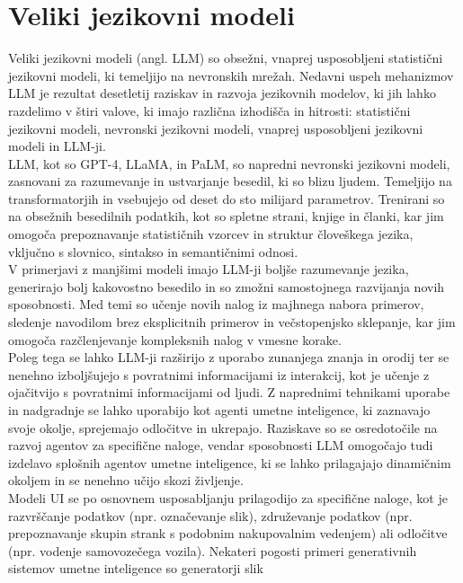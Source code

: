 \documentclass[a4paper,12pt,openright]{book}
\begin{document}
\section{Veliki jezikovni modeli}
Veliki jezikovni modeli (angl. LLM) so obsežni, vnaprej usposobljeni statistični jezikovni modeli, ki temeljijo na nevronskih mrežah. Nedavni uspeh mehanizmov LLM je rezultat desetletij raziskav in razvoja jezikovnih modelov, ki jih lahko razdelimo v štiri valove, ki imajo različna izhodišča in hitrosti: statistični jezikovni modeli, nevronski jezikovni modeli, vnaprej usposobljeni jezikovni modeli in LLM-ji.\cite{minaee2024largelanguagemodelssurvey} \\
LLM, kot so GPT-4, LLaMA, in PaLM, so napredni nevronski jezikovni modeli, zasnovani za razumevanje in ustvarjanje besedil, ki so blizu ljudem. Temeljijo na transformatorjih in vsebujejo od deset do sto milijard parametrov. Trenirani so na obsežnih besedilnih podatkih, kot so spletne strani, knjige in članki, kar jim omogoča prepoznavanje statističnih vzorcev in struktur človeškega jezika, vključno s slovnico, sintakso in semantičnimi odnosi.\cite{10.1145/3520312.3534862} \\
V primerjavi z manjšimi modeli imajo LLM-ji boljše razumevanje jezika, generirajo bolj kakovostno besedilo in so zmožni samostojnega razvijanja novih sposobnosti. Med temi so učenje novih nalog iz majhnega nabora primerov, sledenje navodilom brez eksplicitnih primerov in večstopenjsko sklepanje, kar jim omogoča razčlenjevanje kompleksnih nalog v vmesne korake. \cite{minaee2024largelanguagemodelssurvey} \\
Poleg tega se lahko LLM-ji razširijo z uporabo zunanjega znanja in orodij ter se nenehno izboljšujejo s povratnimi informacijami iz interakcij, kot je učenje z ojačitvijo s povratnimi informacijami od ljudi. Z naprednimi tehnikami uporabe in nadgradnje se lahko uporabijo kot agenti umetne inteligence, ki zaznavajo svoje okolje, sprejemajo odločitve in ukrepajo. Raziskave so se osredotočile na razvoj agentov za specifične naloge, vendar sposobnosti LLM omogočajo tudi izdelavo splošnih agentov umetne inteligence, ki se lahko prilagajajo dinamičnim okoljem in se nenehno učijo skozi življenje.
\cite{minaee2024largelanguagemodelssurvey} \\
Modeli UI se po osnovnem usposabljanju prilagodijo za specifične naloge, kot je razvrščanje podatkov (npr. označevanje slik), združevanje podatkov (npr. prepoznavanje skupin strank s podobnim nakupovalnim vedenjem) ali
odločitve (npr. vodenje samovozečega vozila). Nekateri pogosti primeri generativnih sistemov umetne inteligence so generatorji slik
\end{document}
